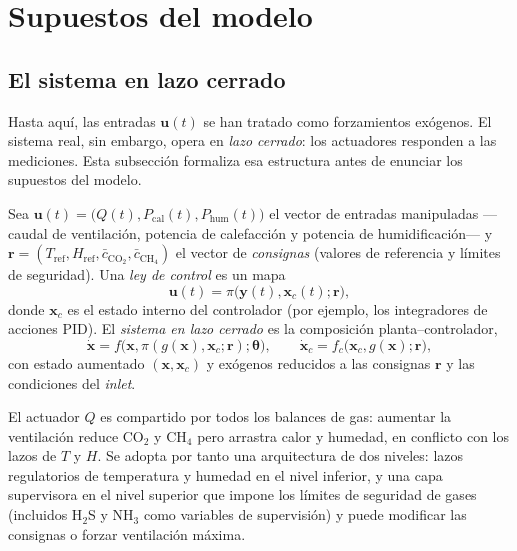 \section{Supuestos del modelo}\label{sec:supuestos}

\subsection{El sistema en lazo cerrado}

Hasta aquí, las entradas $\mathbf{u}(t)$ se han tratado como forzamientos
exógenos. El sistema real, sin embargo, opera en \emph{lazo cerrado}: los
actuadores responden a las mediciones. Esta subsección formaliza esa
estructura antes de enunciar los supuestos del modelo.

\begin{definition}\label{def41}
Sea $\mathbf{u}(t) = \bigl(Q(t), P_{\mathrm{cal}}(t), P_{\mathrm{hum}}(t)\bigr)$
el vector de entradas manipuladas ---caudal de ventilación, potencia de
calefacción y potencia de humidificación--- y
$\mathbf{r} = (T_{\mathrm{ref}}, H_{\mathrm{ref}}, \bar{c}_{\mathrm{CO_2}},
\bar{c}_{\mathrm{CH_4}})$ el vector de \emph{consignas} (valores de
referencia y límites de seguridad). Una \emph{ley de control} es un mapa
\begin{equation}
\mathbf{u}(t) = \pi\bigl(\mathbf{y}(t), \mathbf{x}_c(t); \mathbf{r}\bigr),
\label{eq:ley-control}
\end{equation}
donde $\mathbf{x}_c$ es el estado interno del controlador (por ejemplo, los
integradores de acciones PID). El \emph{sistema en lazo cerrado} es la
composición planta--controlador,
\begin{equation}
\dot{\mathbf{x}} = f\bigl(\mathbf{x}, \pi(g(\mathbf{x}), \mathbf{x}_c;
\mathbf{r}); \boldsymbol{\theta}\bigr),
\qquad
\dot{\mathbf{x}}_c = f_c\bigl(\mathbf{x}_c, g(\mathbf{x});
\mathbf{r}\bigr),
\label{eq:lazo-cerrado}
\end{equation}
con estado aumentado $(\mathbf{x}, \mathbf{x}_c)$ y exógenos reducidos a
las consignas $\mathbf{r}$ y las condiciones del \emph{inlet}.
\end{definition}

\begin{remark}\label{rem:jerarquia}
El actuador $Q$ es compartido por todos los balances de gas: aumentar la
ventilación reduce CO$_2$ y CH$_4$ pero arrastra calor y humedad, en
conflicto con los lazos de $T$ y $H$. Se adopta por tanto una arquitectura
de dos niveles: lazos regulatorios de temperatura y humedad en el nivel
inferior, y una capa supervisora en el nivel superior que impone los
límites de seguridad de gases (incluidos H$_2$S y NH$_3$ como variables de
supervisión) y puede modificar las consignas o forzar ventilación máxima.
\end{remark}

